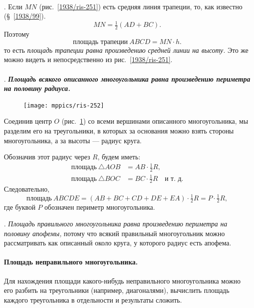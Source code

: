 \documentclass[twoside]{book}
\begin{document}
\paragraph{}\label{1938/251}
.
Если $MN$ (рис.~\ref{1938/ris-251}) есть средняя линия трапеции, то, как известно (§~\ref{1938/99}).
\[MN = \tfrac12(AD+BC).\]
Поэтому
\[\text{площадь трапеции}~ABCD=MN\cdot  h.\]
то есть \emph{площадь трапеции равна произведению средней линии на высоту.}
Это же можно видеть и непосредственно из рис.~\ref{1938/ris-251}.

\paragraph{}\label{1938/252}
.
\textbf{\emph{Площадь всякого описанного многоугольника равна произведению периметра на половину радиуса.}}

\begin{figure}
\centering
\texttt{[image: mppics/ris-252]}
\caption{}\label{1938/ris-252}
\end{figure}

Соединив центр $O$ (рис.~\ref{1938/ris-252}) со всеми вершинами описанного многоугольника, мы разделим его на треугольники, в которых за основания можно взять стороны многоугольника, а за высоты — радиус круга.

Обозначив этот радиус через $R$, будем иметь:
\begin{align*}
\text{площадь}~\triangle AOB&=AB \cdot  \tfrac12R,
\\
\text{площадь}~\triangle BOC &= BC \cdot  \tfrac12R\quad\text{и~т.~д.}
\end{align*}
Следовательно,
\[\text{площадь}~ABCDE = (AB+BC+CD+DE+EA) \cdot  \tfrac12R= P \cdot \tfrac12R,\]
где буквой $P$ обозначен периметр многоугольника.

\smallskip
{}.
\emph{Площадь правильного многоугольника равна произведению периметра на половину апофемы,} потому что всякий правильный многоугольник можно рассматривать как описанный около круга, у которого радиус есть апофема.

\paragraph{Площадь неправильного многоугольника.}\label{1938/253}
Для нахождения площади какого-нибудь неправильного многоугольника можно его разбить на треугольники (например, диагоналями), вычислить площадь каждого треугольника в отдельности и результаты сложить.
\end{document}
